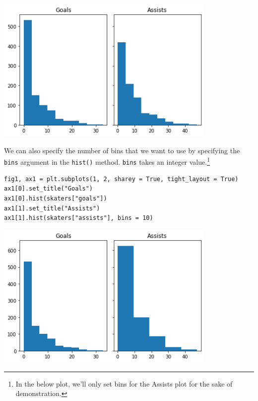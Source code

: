 \includegraphics[width = 0.8\textwidth]{img/hist3.png}

We can also specify the number of bins that we want to use by specifying the \verb|bins| argument in the \verb|hist()| method. \verb|bins| takes an integer value.\footnote{In the below plot, we'll only set bins for the Assists plot for the sake of demonstration.}\par
\begin{lstlisting}[style=pippython]
fig1, ax1 = plt.subplots(1, 2, sharey = True, tight_layout = True)
ax1[0].set_title("Goals")
ax1[0].hist(skaters["goals"])
ax1[1].set_title("Assists")
ax1[1].hist(skaters["assists"], bins = 10)
\end{lstlisting}

\includegraphics[width = 0.8\textwidth]{img/hist4.png}


